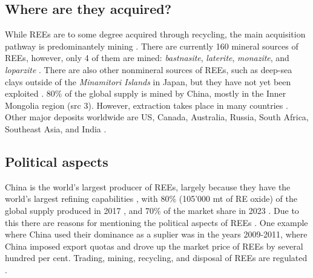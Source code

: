 \subsection{Where are they acquired?}

While REEs are to some degree acquired through recycling, the main acquisition pathway is predominantely mining \cite{britannica2024}\cite{REELandscape}. There are currently 160 mineral sources of REEs, however, only 4 of them are mined: \textit{bastnasite}, \textit{laterite}, \textit{monazite}, and \textit{loparzite} \cite{britannica2024}. There are also other nonmineral sources of REEs, such as deep-sea clays outside of the \textit{Minamitori Islands} in Japan, but they have not yet been exploited \cite{britannica2024}. 80\% of the global supply is mined by China, mostly in the Inner Mongolia region (src 3). However, extraction takes place in many countries \cite{britannica2024}. Other major deposits worldwide are US, Canada, Australia, Russia, South Africa, Southeast Asia, and India \cite{britannica2024}.

\subsection{Political aspects}

China is the world's largest producer of REEs, largely because they have the world's largest refining capabilities \cite{ChinaRefining}, with 80\% (105'000 mt of RE oxide) of the global supply produced in 2017 \cite{britannica2024}, and 70\% of the market share in 2023 \cite{ChinaRefining}. Due to this there are reasons for mentioning the political aspects of REEs \cite{britannica2024}. One example where China used their dominance as a suplier was in the years 2009-2011, where China imposed export quotas and drove up the market price of REEs by several hundred per cent\cite{britannica2024}. Trading, mining, recycling, and disposal of REEs are regulated \cite{REELandscape}.